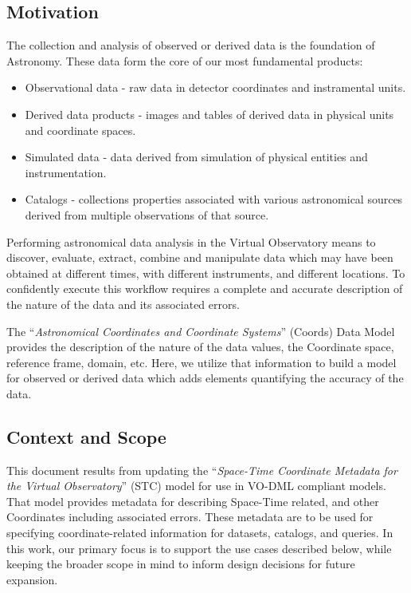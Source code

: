 \documentclass[11pt,a4paper]{ivoa}
\begin{document}
\subsection{Motivation}
The collection and analysis of observed or derived data is the foundation of Astronomy.  
These data form the core of our most fundamental products:
\begin{itemize}
  \item Observational data - raw data in detector coordinates and instramental units.
  \item Derived data products - images and tables of derived data in physical units and coordinate spaces.
  \item Simulated data - data derived from simulation of physical entities and instrumentation.
  \item Catalogs - collections properties associated with various astronomical sources derived from multiple observations of that source.
\end{itemize}

Performing astronomical data analysis in the Virtual Observatory means to discover, evaluate, 
extract, combine and manipulate data which may have been obtained at different times, 
with different instruments, and different locations.  To confidently execute this workflow 
requires a complete and accurate description of the nature of the data and its associated errors.  

The ``\emph{Astronomical Coordinates and Coordinate Systems}'' (Coords) \citep{std:Coords} Data Model provides the description of the nature of the data values, the Coordinate space, reference frame, domain, etc.  Here, we utilize that information to build a model for observed or derived data which adds elements quantifying the accuracy of the data.

\subsection{Context and Scope}

This document results from updating the ``\emph{Space-Time Coordinate Metadata for the Virtual Observatory}'' (STC) \citep{2007ivoa.spec.1030R} model for use in VO-DML compliant models.  That model provides metadata for describing Space-Time related, and other Coordinates including associated errors.  These metadata are to be used for specifying coordinate-related information for datasets, catalogs, and queries.  In this work, our primary focus is to support the use cases described below, while keeping the broader scope in mind to inform design decisions for future expansion.
\end{document}
